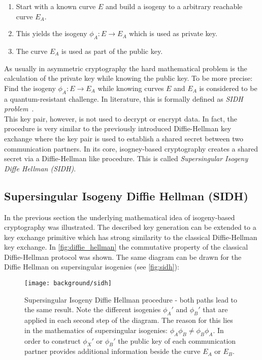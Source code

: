 \begin{enumerate}
\item Start with a known curve $E$ and build a isogeny to a arbitrary reachable curve $E_A$.
\item This yields the isogeny $\phi_A: E \to E_A$ which is used as private key.
\item The curve $E_A$ is used as part of the public key.
\end{enumerate}
As usually in asymmetric cryptography the hard mathematical problem is the calculation of the private key while knowing the public key. To be more precise: Find the isogeny $\phi_A: E \to E_A$ while knowing curves $E$ and $E_A$ is considered to be a quantum-resistant challenge. In literature, this is formally defined as \textit{SIDH problem}~\parencite{sike2020spec}. 
\\
This key pair, however, is not used to decrypt or encrypt data. In fact, the procedure is very similar to the previously introduced Diffie-Hellman key exchange where the key pair is used to establish a shared secret between two communication partners.
In its core, isogney-based cryptography creates a shared secret via a Diffie-Hellman like procedure. This is called \textit{Supersingular Isogeny Diffe Hellman (SIDH)}.

\subsection{Supersingular Isogeny Diffie Hellman (SIDH)}

In the previous section the underlying mathematical idea of isogeny-based cryptography was illustrated. The described key generation can be extended to a key exchange primitive which has strong similarity to the classical Diffie-Hellman key exchange.
In  \autoref{fig:diffie_hellman} the commutative property of the classical Diffie-Hellman protocol was shown. The same diagram can be drawn for the Diffie Hellman on supersingular isogenies (see \autoref{fig:sidh}):
\begin{figure}[H]
  \centering
  \texttt{[image: background/sidh]}
  \caption[Supersingular Isogeny Diffie Hellman diagram]{Supersingular Isogeny Diffie Hellman procedure - both paths lead to the same result. Note the different isogenies $\phi_{A}'$ and $\phi_{B}'$ that are applied in each second step of the diagram. The reason for this lies in the mathematics of supersingular isogenies: $\phi_{A} \phi_{B} \neq \phi_{B} \phi_{A}$. In order to construct $\phi_{X}'$ or $\phi_{B}'$ the public key of each communication partner provides additional information beside the curve $E_A$ or $E_B$.~\parencite{costello2016gentle}}
  \label{fig:sidh}
\end{figure}

